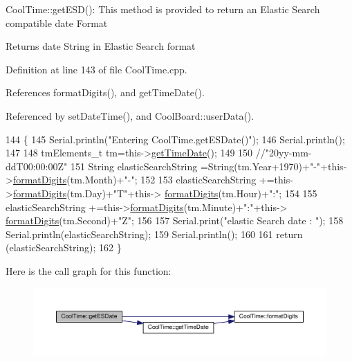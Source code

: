 Cool\+Time\+::get\+E\+S\+D()\+: This method is provided to return an Elastic Search compatible date Format

\begin{DoxyReturn}{Returns}
date String in Elastic Search format 
\end{DoxyReturn}


Definition at line 143 of file Cool\+Time.\+cpp.



References format\+Digits(), and get\+Time\+Date().



Referenced by set\+Date\+Time(), and Cool\+Board\+::user\+Data().


\begin{DoxyCode}
144 \{
145     Serial.println(\textcolor{stringliteral}{"Entering CoolTime.getESDate()"});
146     Serial.println();
147 
148     tmElements\_t tm=this->\hyperlink{classCoolTime_a7a7501c5ca77dd1248bea704c44f986c}{getTimeDate}();
149 
150     \textcolor{comment}{//"20yy-mm-ddT00:00:00Z"}
151     String elasticSearchString =String(tm.Year+1970)+\textcolor{stringliteral}{"-"}+this->\hyperlink{classCoolTime_acd537cd4210d7bde4e1f5c47d2ac0456}{formatDigits}(tm.Month)+\textcolor{stringliteral}{"-"};
152 
153     elasticSearchString +=this->\hyperlink{classCoolTime_acd537cd4210d7bde4e1f5c47d2ac0456}{formatDigits}(tm.Day)+\textcolor{stringliteral}{"T"}+this->
      \hyperlink{classCoolTime_acd537cd4210d7bde4e1f5c47d2ac0456}{formatDigits}(tm.Hour)+\textcolor{stringliteral}{":"};
154     
155     elasticSearchString +=this->\hyperlink{classCoolTime_acd537cd4210d7bde4e1f5c47d2ac0456}{formatDigits}(tm.Minute)+\textcolor{stringliteral}{":"}+this->
      \hyperlink{classCoolTime_acd537cd4210d7bde4e1f5c47d2ac0456}{formatDigits}(tm.Second)+\textcolor{stringliteral}{"Z"};
156     
157     Serial.print(\textcolor{stringliteral}{"elastic Search date : "});
158     Serial.println(elasticSearchString);
159     Serial.println();
160 
161     \textcolor{keywordflow}{return} (elasticSearchString);
162 \}
\end{DoxyCode}
Here is the call graph for this function\+:
\nopagebreak
\begin{figure}[H]
\begin{center}
\leavevmode
\includegraphics[width=350pt]{classCoolTime_ac4f32ee513c1328d984306645e8785a4_cgraph}
\end{center}
\end{figure}
